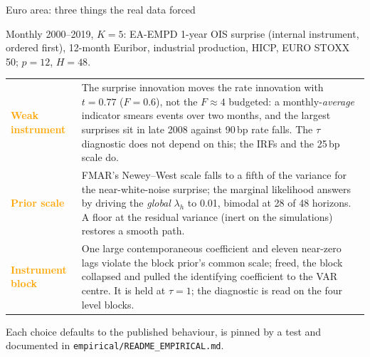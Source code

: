 \documentclass[aspectratio=169,11pt]{beamer}
\newcommand{\smallsource}[1]{%
  \par\vfill{\fontsize{7}{8.4}\selectfont\color{MidGray}#1}%
}
\newcommand{\statusrow}[3]{%
  \textcolor{#1}{\bfseries #2} & #3\\[1.2mm]
}
\begin{document}
\begin{frame}{Euro area: three things the real data forced}
  \vspace{-1mm}
  {\fontsize{9.8}{11.9}\selectfont
  Monthly 2000--2019, $K=5$: EA-EMPD 1-year OIS surprise (internal instrument, ordered first), 12-month Euribor, industrial production, HICP, EURO STOXX 50; $p=12$, $H=48$.
  \vspace{1mm}
  \renewcommand{\arraystretch}{1.0}
  \begin{tabularx}{\textwidth}{p{} X}
    \statusrow{Orange}{Weak instrument}{The surprise innovation moves the rate innovation with $t=0.77$ ($F=0.6$), not the $F\approx4$ budgeted: a monthly-\emph{average} indicator smears events over two months, and the largest surprises sit in late 2008 against 90\,bp rate falls. The $\tau$ diagnostic does not depend on this; the IRFs and the 25\,bp scale do.}
    \statusrow{Orange}{Prior scale}{FMAR's Newey--West scale falls to a fifth of the variance for the near-white-noise surprise; the marginal likelihood answers by driving the \emph{global} $\lambda_h$ to 0.01, bimodal at 28 of 48 horizons. A floor at the residual variance (inert on the simulations) restores a smooth path.}
    \statusrow{Orange}{Instrument block}{One large contemporaneous coefficient and eleven near-zero lags violate the block prior's common scale; freed, the block collapsed and pulled the identifying coefficient to the VAR centre. It is held at $\tau=1$; the diagnostic is read on the four level blocks.}
  \end{tabularx}}
  \smallsource{Each choice defaults to the published behaviour, is pinned by a test and documented in \texttt{empirical/README\_EMPIRICAL.md}.}
\end{frame}
\end{document}

